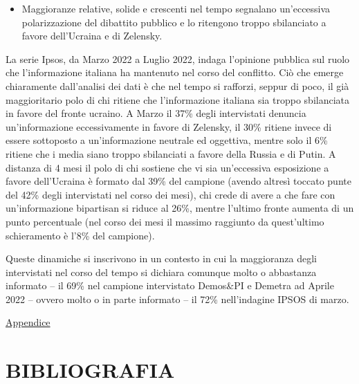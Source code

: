 \documentclass[
  openany]{book}
\providecommand{\tightlist}{%
  \setlength{\itemsep}{0pt}\setlength{\parskip}{0pt}}
\begin{document}
\begin{itemize}
\tightlist
\item
  Maggioranze relative, solide e crescenti nel tempo segnalano un'eccessiva polarizzazione del dibattito pubblico e lo ritengono troppo sbilanciato a favore dell'Ucraina e di Zelensky.
\end{itemize}

La serie Ipsos, da Marzo 2022 a Luglio 2022, indaga l'opinione pubblica sul ruolo che l'informazione italiana ha mantenuto nel corso del conflitto. Ciò che emerge chiaramente dall'analisi dei dati è che nel tempo si rafforzi, seppur di poco, il già maggioritario polo di chi ritiene che l'informazione italiana sia troppo sbilanciata in favore del fronte ucraino. A Marzo il 37\% degli intervistati denuncia un'informazione eccessivamente in favore di Zelensky, il 30\% ritiene invece di essere sottoposto a un'informazione neutrale ed oggettiva, mentre solo il 6\% ritiene che i media siano troppo sbilanciati a favore della Russia e di Putin. A distanza di 4 mesi il polo di chi sostiene che vi sia un'eccessiva esposizione a favore dell'Ucraina è formato dal 39\% del campione (avendo altresì toccato punte del 42\% degli intervistati nel corso dei mesi), chi crede di avere a che fare con un'informazione bipartisan si riduce al 26\%, mentre l'ultimo fronte aumenta di un punto percentuale (nel corso dei mesi il massimo raggiunto da quest'ultimo schieramento è l'8\% del campione).

Queste dinamiche si inscrivono in un contesto in cui la maggioranza degli intervistati nel corso del tempo si dichiara comunque molto o abbastanza informato -- il 69\% nel campione intervistato Demos\&PI e Demetra ad Aprile 2022 -- ovvero molto o in parte informato -- il 72\% nell'indagine IPSOS di marzo.

\href{https://github.com/LucianaFazio/Ucrania/blob/main/PDF_Appendice/VIII.\%20Ruolo\%20dei\%20media.pdf}{Appendice}

\hypertarget{bibliografia}{%
\chapter*{BIBLIOGRAFIA}\label{bibliografia}}

  
\end{document}
